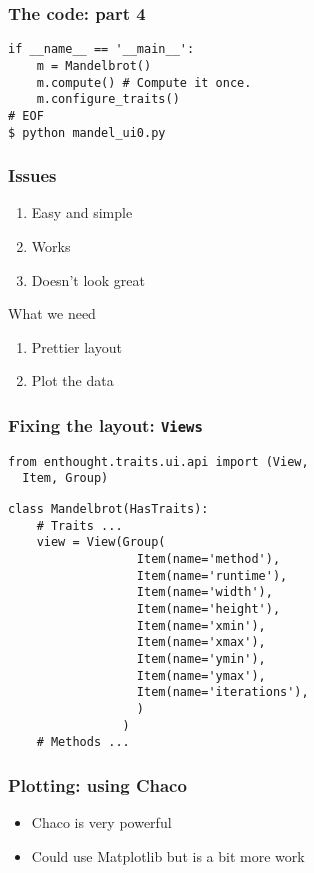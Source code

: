 \documentclass[14pt,compress]{beamer}
\newcounter{time}
\newcommand{\inctime}[1]{\addtocounter{time}{#1}{\tiny \thetime\ m}}
\newcommand{\typ}[1]{\lstinline{#1}}
\begin{document}
\begin{frame}
  \frametitle{The code: part 4}
\small
\begin{lstlisting}
if __name__ == '__main__':
    m = Mandelbrot()
    m.compute() # Compute it once.
    m.configure_traits()
# EOF
$ python mandel_ui0.py
  \end{lstlisting}
  \begin{center}
  \end{center}
  \inctime{10}
\end{frame}

\begin{frame}
    \frametitle{Issues}
    \begin{enumerate}
    \item Easy and simple
    \item Works
    \item Doesn't look great
    \end{enumerate}
    \begin{block}{What we need}
        \begin{enumerate}
            \item Prettier layout
            \item Plot the data
        \end{enumerate}
    \end{block}
\end{frame}

\begin{frame}
    \frametitle{Fixing the layout: \typ{Views}}
    \vspace*{-1ex}
\small
\begin{lstlisting}
from enthought.traits.ui.api import (View,
  Item, Group)
\end{lstlisting}
\pause
\begin{lstlisting}
class Mandelbrot(HasTraits):
    # Traits ...
    view = View(Group(
                  Item(name='method'),
                  Item(name='runtime'),
                  Item(name='width'),
                  Item(name='height'),
                  Item(name='xmin'),
                  Item(name='xmax'),
                  Item(name='ymin'),
                  Item(name='ymax'),
                  Item(name='iterations'),
                  )
                )
    # Methods ...
  \end{lstlisting}
\end{frame}

\begin{frame}
    \frametitle{Plotting: using Chaco}
    \begin{itemize}
        \item Chaco is very powerful
        \item Could use Matplotlib but is a bit more work
    \end{itemize}
\end{frame}
\end{document}
